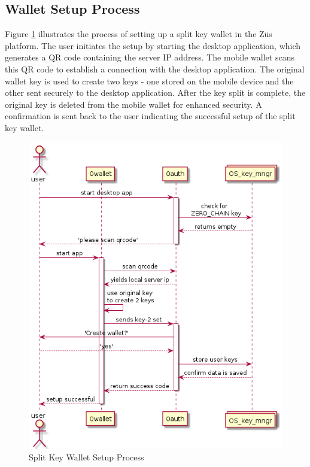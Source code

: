 \subsection{Wallet Setup Process}
Figure \ref{fig:setup} illustrates the process of setting up a split key wallet in the Züs platform. The user initiates the setup by starting the desktop application, which generates a QR code containing the server IP address. The mobile wallet scans this QR code to establish a connection with the desktop application.
The original wallet key is used to create two keys - one stored on the mobile device and the other sent securely to the desktop application. After the key split is complete, the original key is deleted from the mobile wallet for enhanced security. A confirmation is sent back to the user indicating the successful setup of the split key wallet.
\begin{figure}[h]
\centering
\includegraphics[width=\textwidth]{Images/setup_diagram.png}
\caption{Split Key Wallet Setup Process}
\label{fig:setup}
\end{figure}
